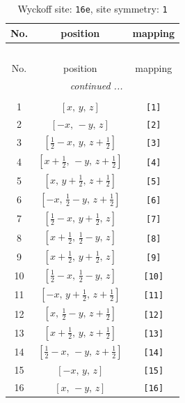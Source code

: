 \documentclass[fleqn,8pt]{jsarticle}
\begin{document}
\begin{longtable}{ccc}
\caption{Wyckoff site: {\tt 16e}, site symmetry: {\tt 1}}
 \\
 \hline \hline
No. & position & mapping \\ \hline \endfirsthead

\multicolumn{2}{l}{\tablename\ \thetable{}} \\
 \hline \hline
No. & position & mapping \\ \hline \endhead

 \hline \hline
\multicolumn{2}{r}{\footnotesize\it continued ...} \\ \endfoot

 \hline \hline
\multicolumn{2}{r}{} \\ \endlastfoot

1 & $\left[ x,\, y,\, z \right]$ & {\tt [1]} \\ \hline
2 & $\left[ - x,\, - y,\, z \right]$ & {\tt [2]} \\ \hline
3 & $\left[ \frac{1}{2} - x,\, y,\, z + \frac{1}{2} \right]$ & {\tt [3]} \\ \hline
4 & $\left[ x + \frac{1}{2},\, - y,\, z + \frac{1}{2} \right]$ & {\tt [4]} \\ \hline
5 & $\left[ x,\, y + \frac{1}{2},\, z + \frac{1}{2} \right]$ & {\tt [5]} \\ \hline
6 & $\left[ - x,\, \frac{1}{2} - y,\, z + \frac{1}{2} \right]$ & {\tt [6]} \\ \hline
7 & $\left[ \frac{1}{2} - x,\, y + \frac{1}{2},\, z \right]$ & {\tt [7]} \\ \hline
8 & $\left[ x + \frac{1}{2},\, \frac{1}{2} - y,\, z \right]$ & {\tt [8]} \\ \hline
9 & $\left[ x + \frac{1}{2},\, y + \frac{1}{2},\, z \right]$ & {\tt [9]} \\ \hline
10 & $\left[ \frac{1}{2} - x,\, \frac{1}{2} - y,\, z \right]$ & {\tt [10]} \\ \hline
11 & $\left[ - x,\, y + \frac{1}{2},\, z + \frac{1}{2} \right]$ & {\tt [11]} \\ \hline
12 & $\left[ x,\, \frac{1}{2} - y,\, z + \frac{1}{2} \right]$ & {\tt [12]} \\ \hline
13 & $\left[ x + \frac{1}{2},\, y,\, z + \frac{1}{2} \right]$ & {\tt [13]} \\ \hline
14 & $\left[ \frac{1}{2} - x,\, - y,\, z + \frac{1}{2} \right]$ & {\tt [14]} \\ \hline
15 & $\left[ - x,\, y,\, z \right]$ & {\tt [15]} \\ \hline
16 & $\left[ x,\, - y,\, z \right]$ & {\tt [16]} \\
\end{longtable}
\end{document}
